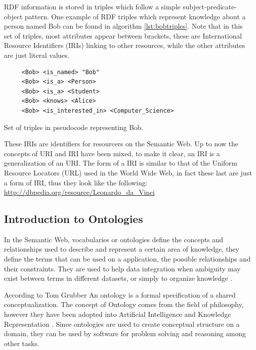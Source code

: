 RDF information is stored in triples which follow a simple subject-predicate-object pattern. One example of RDF triples which represent knowledge about a person named Bob can be found in algorithm \ref{lst:bobtriples}. Note that in this set of triples, most attributes appear between brackets, these are International Resource Identifiers (IRIs) linking to other resources, while the other attributes are just literal values. 

\begin{listing}\centering
  \begin{minipage}{.4\textwidth}
    \begin{verbatim}
     <Bob> <is_named> "Bob"
     <Bob> <is_a> <Person>
     <Bob> <is_a> <Student>
     <Bob> <knows> <Alice>
     <Bob> <is_interested_in> <Computer_Science>
    \end{verbatim}
  \end{minipage}
  \caption{Set of triples in pseudocode representing Bob.}\label{lst:bobtriples}
\end{listing}

These IRIs are identifiers for resourcers on the Semantic Web. Up to now the concepts of URI and IRI have been mixed, to make it clear, an IRI is a generalization of an URI. The form of a IRI is similar to that of the Uniform Resource Locators (URL) used in the World Wide Web, in fact these last are just a form of IRI, thus they look like the following:  \url{http://dbpedia.org/resource/Leonardo_da_Vinci}
 

\subsection{Introduction to Ontologies}

In the Semantic Web, vocabularies or ontologies define the concepts and relationships used to describe and represent a certain area of knowledge, they define the terms that can be used on a application, the possible relationships and their constraints. They are used to help data integration when ambiguity may exist between terms in different datasets, or simply to organize knowledge \cite{w3contologies}.

According to Tom Grubber \cite{gruber1993ontology} An ontology is a formal specification of a shared conceptualization. The concept of Ontology comes from the field of philosophy, however they have been adopted into Artificial Intelligence and Knowledge Representation \cite{chandrasekaran1999ontologies}. Since ontologies are used to create conceptual structure on a domain, they can be used by software for problem solving and reasoning among other tasks.

